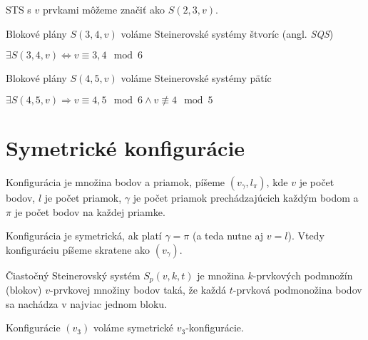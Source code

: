 \begin{remark}
STS s $v$ prvkami môžeme značiť ako $S(2,3,v)$.
\end{remark}

\begin{definition}
Blokové plány $S(3,4,v)$ voláme Steinerovské systémy štvoríc (angl. \emph{SQS})
\end{definition}

\begin{theorem_hard}

$\exists S(3,4,v) \Longleftrightarrow v \equiv 3,4 \mod 6$

\end{theorem_hard}


\begin{definition}
Blokové plány $S(4,5,v)$ voláme Steinerovské systémy pätíc
\end{definition}


\begin{theorem_hard}

$\exists S(4,5,v) \Longrightarrow v \equiv 4,5 \mod 6 \wedge v \not\equiv 4 \mod 5$

\end{theorem_hard}

\section{Symetrické konfigurácie}

\begin{definition}
	Konfigurácia je množina bodov a priamok, píšeme $(v_\gamma, l_\pi)$, kde $v$ je počet bodov, $l$ je počet priamok, $\gamma$ je počet priamok prechádzajúcich každým bodom a $\pi$ je počet bodov na každej priamke.
\end{definition}

\begin{definition}
	Konfigurácia je symetrická, ak platí $\gamma = \pi$ (a teda nutne aj $v = l$). Vtedy konfiguráciu píšeme skratene ako $(v_\gamma)$.
\end{definition}

\begin{definition}
	Čiastočný Steinerovský systém $S_p(v, k, t)$ je množina $k$-prvkových podmnožín (blokov) $v$-prvkovej množiny bodov taká, že každá $t$-prvková podmonožina bodov sa nachádza v najviac jednom bloku.
\end{definition}

Konfigurácie $(v_3)$ voláme symetrické $v_3$-konfigurácie.

